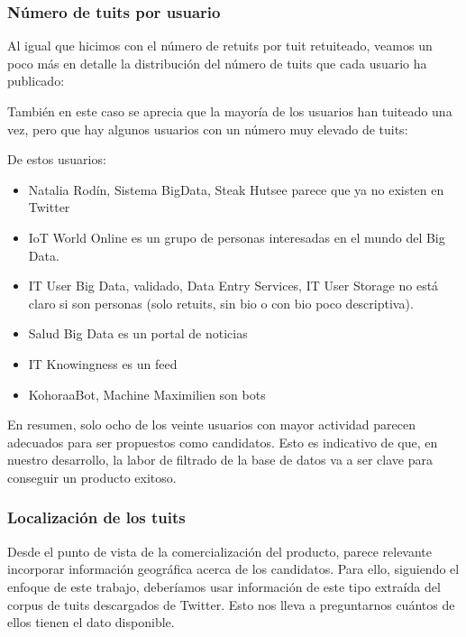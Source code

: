 \subsubsection{Número de tuits por usuario}
Al igual que hicimos con el número de retuits por tuit retuiteado, veamos un poco más en detalle
la distribución del número de tuits que cada usuario ha publicado:


También en este caso se aprecia que la mayoría de los usuarios han tuiteado una vez, pero que hay algunos usuarios con un número muy elevado de tuits:


De estos usuarios:
\begin{itemize}
\setlength\itemsep{-0.1cm}
\item Natalia Rodín, Sistema BigData, Steak Hutsee parece que ya no existen en Twitter
\item IoT World Online es un grupo de personas interesadas en el mundo del Big Data.
\item IT User Big Data, validado, Data Entry Services, IT User Storage no está claro si son personas (solo retuits, sin bio o con bio poco descriptiva).
\item Salud Big Data es un portal de noticias
\item IT Knowingness es un feed 
\item KohoraaBot, Machine Maximilien son bots
\end{itemize}

En resumen, solo ocho de los veinte usuarios con mayor actividad parecen adecuados para
ser propuestos como candidatos. Esto es indicativo de que, en nuestro desarrollo, la labor de filtrado de la base de datos va a ser clave para conseguir un producto exitoso.

\subsubsection{Localización de los tuits}
Desde el punto de vista de la comercialización del producto, parece relevante incorporar información geográfica acerca de los candidatos. Para ello, siguiendo el enfoque de este trabajo, deberíamos usar información de este tipo extraída del corpus de tuits descargados de Twitter. Esto nos lleva a preguntarnos cuántos de ellos tienen el dato disponible. 


